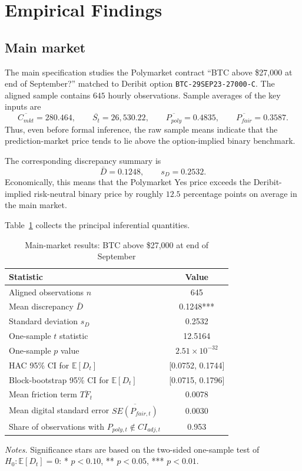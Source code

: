 \documentclass[11pt]{article}
\numberwithin{equation}{section}
\theoremstyle{plain}
\begin{document}
\section{Empirical Findings}
\subsection{Main market}
The main specification studies the Polymarket contract ``BTC above \$27{,}000 at end of September?'' matched to Deribit option \texttt{BTC-29SEP23-27000-C}. The aligned sample contains $645$ hourly observations. Sample averages of the key inputs are
\[
\overline{C_{mkt}} = 280.464,
\qquad
\overline{S_t} = 26{,}530.22,
\qquad
\overline{P_{poly}} = 0.4835,
\qquad
\overline{P_{fair}} = 0.3587.
\]
Thus, even before formal inference, the raw sample means indicate that the prediction-market price tends to lie above the option-implied binary benchmark.

The corresponding discrepancy summary is
\[
\bar{D}=0.1248,
\qquad
s_D=0.2532.
\]
Economically, this means that the Polymarket Yes price exceeds the Deribit-implied risk-neutral binary price by roughly $12.5$ percentage points on average in the main market.

Table~\ref{tab:main} collects the principal inferential quantities.

\begin{table}[H]
\centering
\caption{Main-market results: BTC above \$27{,}000 at end of September}
\label{tab:main}
\begin{threeparttable}
\begin{tabular}{lc}
\toprule
Statistic & Value \\
\midrule
Aligned observations $n$ & 645 \\
Mean discrepancy $\bar{D}$ & 0.1248*** \\
Standard deviation $s_D$ & 0.2532 \\
One-sample $t$ statistic & 12.5164 \\
One-sample $p$ value & $2.51 \times 10^{-32}$ \\
HAC 95\% CI for $\mathbb{E}[D_t]$ & [0.0752, 0.1744] \\
Block-bootstrap 95\% CI for $\mathbb{E}[D_t]$ & [0.0715, 0.1796] \\
Mean friction term $\overline{TF_t}$ & 0.0078 \\
Mean digital standard error $\overline{SE(P_{fair,t})}$ & 0.0030 \\
Share of observations with $P_{poly,t}\notin CI_{adj,t}$ & 0.953 \\
\bottomrule
\end{tabular}
\begin{tablenotes}[flushleft]
\footnotesize
\item \textit{Notes.} Significance stars are based on the two-sided one-sample test of $H_0:\mathbb{E}[D_t]=0$: * $p<0.10$, ** $p<0.05$, *** $p<0.01$.
\end{tablenotes}
\end{threeparttable}
\end{table}
\end{document}
